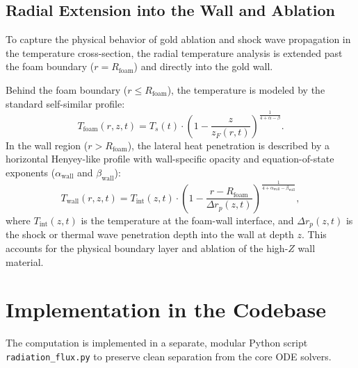 \documentclass{article}
\begin{document}
\subsection{Radial Extension into the Wall and Ablation}
To capture the physical behavior of gold ablation and shock wave propagation in the temperature cross-section, the radial temperature analysis is extended past the foam boundary ($r = R_{\text{foam}}$) and directly into the gold wall. 

Behind the foam boundary ($r \le R_{\text{foam}}$), the temperature is modeled by the standard self-similar profile:
\begin{equation}
T_{\text{foam}}(r, z, t) = T_s(t) \cdot \left( 1 - \frac{z}{z_F(r, t)} \right)^{\frac{1}{4+\alpha-\beta}}.
\end{equation}
In the wall region ($r > R_{\text{foam}}$), the lateral heat penetration is described by a horizontal Henyey-like profile with wall-specific opacity and equation-of-state exponents ($\alpha_{\text{wall}}$ and $\beta_{\text{wall}}$):
\begin{equation}
T_{\text{wall}}(r, z, t) = T_{\text{int}}(z, t) \cdot \left( 1 - \frac{r - R_{\text{foam}}}{\Delta r_p(z, t)} \right)^{\frac{1}{4+\alpha_{\text{wall}}-\beta_{\text{wall}}}},
\end{equation}
where $T_{\text{int}}(z, t)$ is the temperature at the foam-wall interface, and $\Delta r_p(z, t)$ is the shock or thermal wave penetration depth into the wall at depth $z$. This accounts for the physical boundary layer and ablation of the high-$Z$ wall material.

\section{Implementation in the Codebase}

The computation is implemented in a separate, modular Python script \texttt{radiation\_flux.py} to preserve clean separation from the core ODE solvers.
\end{document}
